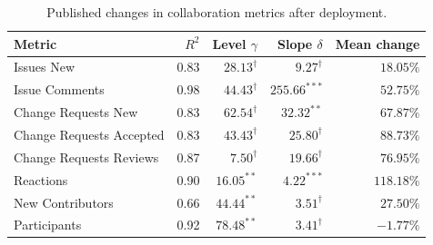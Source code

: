 \begin{table}[tbp]
\centering
\caption{Published changes in collaboration metrics after deployment.}\label{tab:ch6-estimates}
\fontsize{9.3}{11.8}\selectfont
\renewcommand{\arraystretch}{1.13}
\begin{tabularx}{\textwidth}{@{}>{\raggedright\arraybackslash}Xrrrr@{}}
\toprule
Metric & $R^2$ & Level $\gamma$ & Slope $\delta$ & Mean change\\
\midrule
Issues New & 0.83 & $28.13^{\dagger}$ & $9.27^{\dagger}$ & $18.05\%$\\
Issue Comments & 0.98 & $44.43^{\dagger}$ & $255.66^{***}$ & $52.75\%$\\
Change Requests New & 0.83 & $62.54^{\dagger}$ & $32.32^{**}$ & $67.87\%$\\
Change Requests Accepted & 0.83 & $43.43^{\dagger}$ & $25.80^{\dagger}$ & $88.73\%$\\
Change Requests Reviews & 0.87 & $7.50^{\dagger}$ & $19.66^{\dagger}$ & $76.95\%$\\
Reactions & 0.90 & $16.05^{**}$ & $4.22^{***}$ & $118.18\%$\\
New Contributors & 0.66 & $44.44^{**}$ & $3.51^{\dagger}$ & $27.50\%$\\
Participants & 0.92 & $78.48^{**}$ & $3.41^{\dagger}$ & $-1.77\%$\\
\bottomrule
\end{tabularx}
\end{table}
